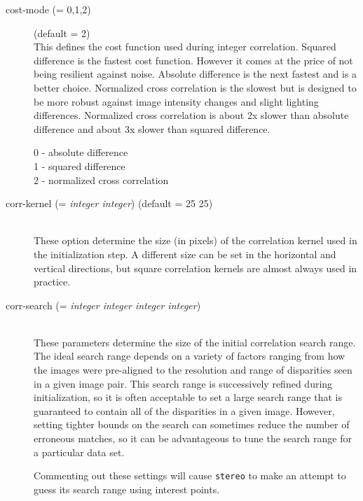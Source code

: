\begin{description}
\item[cost-mode \textnormal{\small{(= 0,1,2)}}] (default = 2) \hfill \\

  This defines the cost function used during integer
  correlation. Squared difference is the fastest cost
  function. However it comes at the price of not being resilient
  against noise. Absolute difference is the next fastest and is a
  better choice. Normalized cross correlation is the slowest but is
  designed to be more robust against image intensity changes and
  slight lighting differences. Normalized cross correlation is about
  2x slower than absolute difference and about 3x slower than squared
  difference.

  \begin{description}
    \item[0 - absolute difference]
    \item[1 - squared difference]
    \item[2 - normalized cross correlation]
  \end{description}

\item[corr-kernel \textnormal{\small{(= \emph{integer integer})}} (default = 25 25)] \hfill \\
  These option determine the size (in pixels) of the correlation
  kernel used in the initialization step.  A different size can be set
  in the horizontal and vertical directions, but square correlation
  kernels are almost always used in practice.

\item[corr-search \textnormal{\small{(= \emph{integer integer integer integer})}}] \hfill \\
  These parameters determine the size of the initial correlation
  search range.  The ideal search range depends on a variety of
  factors ranging from how the images were pre-aligned to the
  resolution and range of disparities seen in a given image pair.
  This search range is successively refined during initialization, so
  it is often acceptable to set a large search range that is guaranteed
  to contain all of the disparities in a given image.  However,
  setting tighter bounds on the search can sometimes reduce the number
  of erroneous matches, so it can be advantageous to tune the
  search range for a particular data set.

  Commenting out these settings will cause \texttt{stereo} to make an
  attempt to guess its search range using interest points.


\end{description}
